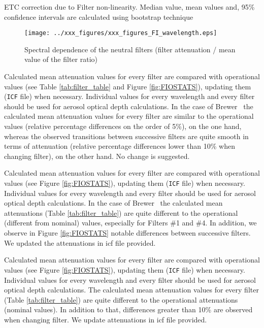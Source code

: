 \vspace{.5cm}
\begin{table}[hbp!] \centering
	\caption{ETC correction due to Filter non-linearity. Median value, mean values and, 95\% confidence intervals are calculated using bootstrap technique}
	\label{tab:filter_correction}
	
\end{table}

\vspace{.5cm}
\begin{figure}[hbtp!]
\begin{center}
\texttt{[image: ../xxx\_figures/xxx\_figures\_FI\_wavelength.eps]}
           \caption{Spectral dependence of the neutral filters (filter attenuation / mean value of the filter ratio)}
	         \label{fig:FI_wavelength}
\end{center}
\end{figure}
\vspace{.5cm}

Calculated mean attenuation values for every filter are compared with operational values (see Table \ref{tab:filter_table} and Figure \ref{fig:FIOSTATS}), updating them (\texttt{ICF} file) when necessary. Individual values for every wavelength and every filter should be used for aerosol optical depth calculations. In the case of Brewer \brwname\ the calculated mean attenuation values for every filter are similar to the operational values (relative percentage differences on the order of 5\%), on the one hand, whereas the observed transitions between successive filters are quite smooth in terms of attenuation (relative percentage differences lower than 10\% when changing filter), on the other hand. No change is suggested.

Calculated mean attenuation values for every filter are compared with operational values (see Figure \ref{fig:FIOSTATS}), updating them (\texttt{ICF} file) when necessary. Individual values for every wavelength and every filter should be used for aerosol optical depth calculations. In the case of Brewer \brwname\ the calculated mean attenuations (Table \ref{tab:filter_table}) are quite different to the operational (different from nominal) values, especially for Filters \#1 and \#4. In addition, we observe in Figure \ref{fig:FIOSTATS} notable differences between successive filters. We updated the attenuations in icf file provided.

Calculated mean attenuation values for every filter are compared with operational values (see Figure \ref{fig:FIOSTATS}), updating them (\texttt{ICF} file) when necessary. Individual values for every wavelength and every filter should be used for aerosol optical depth calculations. The calculated mean attenuation values for every filter (Table \ref{tab:filter_table}) are quite different to the operational attenuations (nominal values). In addition to that, differences greater than 10\% are observed when changing filter. We update attenuations in icf file provided.


